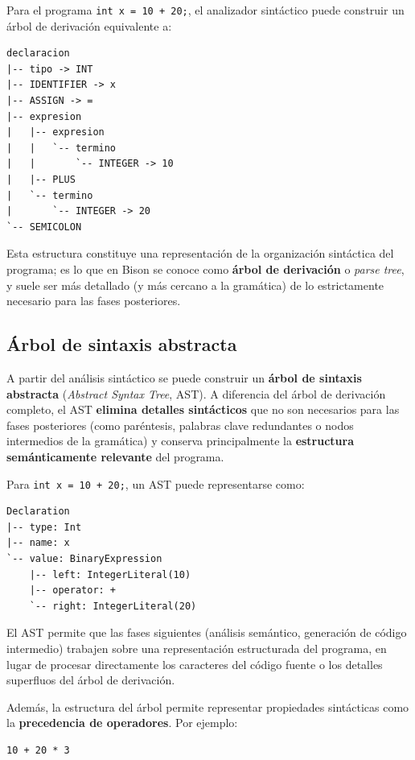 \documentclass[11pt,a4paper]{article}
\begin{document}
Para el programa \texttt{int x = 10 + 20;}, el analizador sintáctico puede construir un árbol
de derivación equivalente a:

\begin{lstlisting}
declaracion
|-- tipo -> INT
|-- IDENTIFIER -> x
|-- ASSIGN -> =
|-- expresion
|   |-- expresion
|   |   `-- termino
|   |       `-- INTEGER -> 10
|   |-- PLUS
|   `-- termino
|       `-- INTEGER -> 20
`-- SEMICOLON
\end{lstlisting}

Esta estructura constituye una representación de la organización sintáctica del programa; es lo
que en Bison se conoce como \textbf{árbol de derivación} o \textit{parse tree}, y suele ser más
detallado (y más cercano a la gramática) de lo estrictamente necesario para las fases
posteriores.

\subsection{Árbol de sintaxis abstracta}
\label{sec:ast}

A partir del análisis sintáctico se puede construir un \textbf{árbol de sintaxis abstracta}
(\textit{Abstract Syntax Tree}, AST). A diferencia del árbol de derivación completo, el AST
\textbf{elimina detalles sintácticos} que no son necesarios para las fases posteriores (como
paréntesis, palabras clave redundantes o nodos intermedios de la gramática) y conserva
principalmente la \textbf{estructura semánticamente relevante} del programa.

Para \texttt{int x = 10 + 20;}, un AST puede representarse como:

\begin{lstlisting}
Declaration
|-- type: Int
|-- name: x
`-- value: BinaryExpression
    |-- left: IntegerLiteral(10)
    |-- operator: +
    `-- right: IntegerLiteral(20)
\end{lstlisting}

El AST permite que las fases siguientes (análisis semántico, generación de código intermedio)
trabajen sobre una representación estructurada del programa, en lugar de procesar directamente
los caracteres del código fuente o los detalles superfluos del árbol de derivación.

Además, la estructura del árbol permite representar propiedades sintácticas como la
\textbf{precedencia de operadores}. Por ejemplo:

\begin{lstlisting}
10 + 20 * 3
\end{lstlisting}
\end{document}
